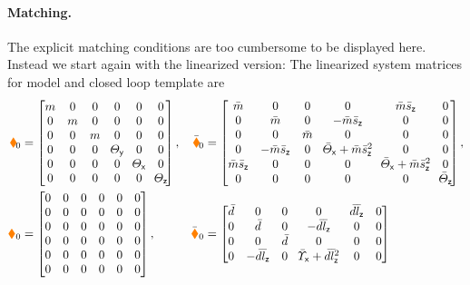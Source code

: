 \paragraph{Matching.}
The explicit matching conditions are too cumbersome to be displayed here.
Instead we start again with the linearized version:
The linearized system matrices for model and closed loop template are
\begin{subequations}
\allowdisplaybreaks
\begin{align*}
 \sysInertiaMatLin &= 
 \begin{bmatrix}
  m & 0 & 0 & 0 & 0 & 0 \\
  0 & m & 0 & 0 & 0 & 0 \\
  0 & 0 & m & 0 & 0 & 0 \\
  0 & 0 & 0 & \!\Jy\! & 0 & 0 \\
  0 & 0 & 0 & 0 & \!\Jx\! & 0 \\
  0 & 0 & 0 & 0 & 0 & \!\Jz\! \\
  \end{bmatrix},&
 \sysInertiaMatCLin &=
 \begin{bmatrix}
  \mc & 0 & 0 & 0 & \mc\scz & 0 \\
  0 & \mc & 0 & -\mc\scz & 0 & 0 \\
  0 & 0 & \mc & 0 & 0 & 0 \\
  0 & -\mc\scz & 0 & \!\Jcx+\mc\scz^2\! & 0 & 0 \\
  \mc\scz & 0 & 0 & 0 & \!\Jcx+\mc\scz^2\! & 0 \\
  0 & 0 & 0 & 0 & 0 & \!\Jcz\! \\
 \end{bmatrix},
\\
 \sysDissMatLin &= 
 \begin{bmatrix}
  0 & 0 & 0 & 0 & 0 & 0 \\
  0 & 0 & 0 & 0 & 0 & 0 \\
  0 & 0 & 0 & 0 & 0 & 0 \\
  0 & 0 & 0 & 0 & 0 & 0 \\
  0 & 0 & 0 & 0 & 0 & 0 \\
  0 & 0 & 0 & 0 & 0 & 0 \\
  \end{bmatrix},&
 \sysDissMatCLin &=
 \begin{bmatrix}
  \dc & 0 & 0 & 0 & \dc\lcz & 0 \\
  0 & \dc & 0 & -\dc\lcz & 0 & 0 \\
  0 & 0 & \dc & 0 & 0 & 0 \\
  0 & -\dc\lcz & 0 & \!\sigcx+\dc\lcz^2\! & 0 & 0 \\

\end{bmatrix}
\end{align*}
\end{subequations}
